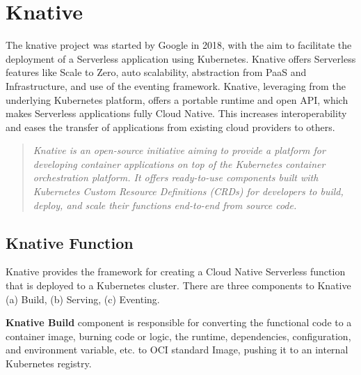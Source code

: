 \documentclass[12pt]{article}
\begin{document}
\section{Knative }
\begin{flushleft}
The knative project was started by Google in 2018, with the aim to facilitate the deployment of a Serverless application using Kubernetes. Knative offers Serverless features like Scale to Zero, auto scalability, abstraction from PaaS and Infrastructure, and use of the eventing framework.
Knative, leveraging from the underlying Kubernetes platform, offers a portable runtime and open API, which makes Serverless applications fully Cloud Native. This increases interoperability and eases the transfer of applications from existing cloud providers to others.
\begin{quote}
    \textit{Knative is an open-source initiative aiming to provide a platform for developing container applications on top of the Kubernetes container orchestration platform. It offers ready-to-use components built with Kubernetes Custom Resource Definitions (CRDs) for developers to build, deploy, and scale their functions end-to-end from source code.}\\
    \cite{lin2019mitigating}
\end{quote}

\subsection{Knative Function}
Knative provides the framework for creating a Cloud Native Serverless function that is deployed to a Kubernetes cluster. There are three components to Knative (a) Build, (b) Serving, (c) Eventing.

\textbf{Knative Build} component is responsible for converting the functional code to a container image, burning code or logic, the runtime, dependencies, configuration, and environment variable, etc. to OCI standard Image, pushing it to an internal Kubernetes registry.



\end{flushleft}
\end{document}
